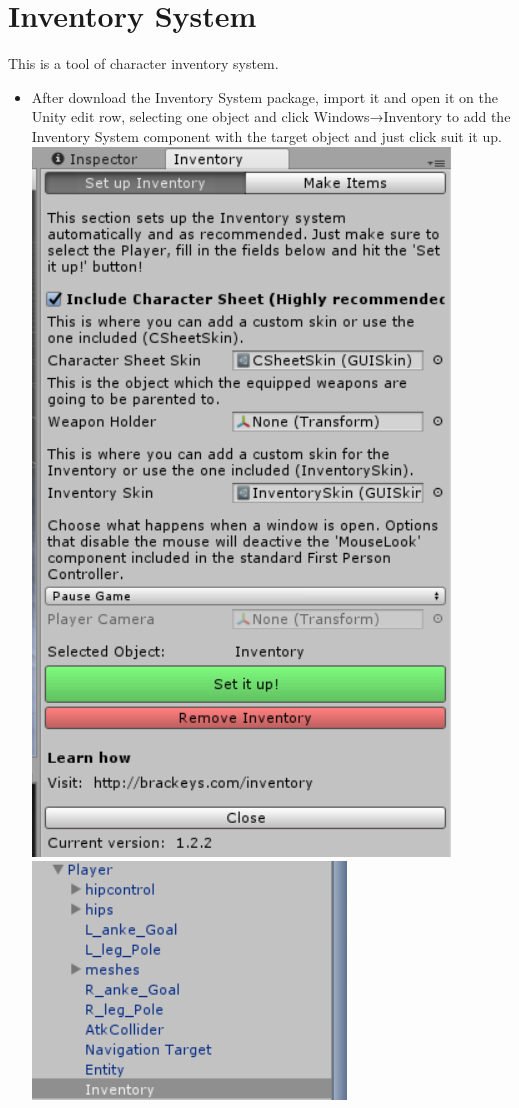 \section{Inventory System}
This is a tool of character inventory system.
\begin{itemize}
\item After download the Inventory System package, import it and open it on the Unity edit row, selecting one object and click Windows→Inventory to add the Inventory System component with the target object and just click suit it up.\\
\includegraphics[scale=0.5]{img/ISI.png}\\
\includegraphics[scale=0.5]{img/ISP.png}\\

\end{itemize}
